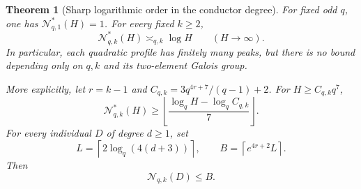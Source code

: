 \documentclass[11pt]{article}
\newtheorem{theorem}{Theorem}[section]
\begin{document}
\begin{theorem}[Sharp logarithmic order in the conductor degree]
\label{thm:quadraticModeComplexity}
For fixed odd \(q\), one has \(\mathcal N_{q,1}^{*}(H)=1\).
For every fixed \(k\geq2\),
\[
                    \mathcal N_{q,k}^{*}(H)
                         \asymp_{q,k}\log H
                    \qquad(H\to\infty).          \tag{22}
\]
In particular, each quadratic profile has finitely many peaks, but
there is no bound depending only on \(q,k\) and its two-element
Galois group.

More explicitly, let \(r=k-1\) and
\(C_{q,k}=3q^{4r+7}/(q-1)+2\). For
\(H\geq C_{q,k}q^7\),
\[
 \mathcal N_{q,k}^{*}(H)\geq
 \left\lfloor\frac{\log_q H-\log_q C_{q,k}}7\right\rfloor.   \tag{23}
\]
For every individual \(D\) of degree \(d\geq1\), set
\[
 L=\left\lceil2\log_q(4(d+3))\right\rceil,\qquad
 B=\left\lceil e^{4r+2}L\right\rceil.
\]
Then
\[
                         \mathcal N_{q,k}(D)\leq B.        \tag{24}
\]
\end{theorem}
\end{document}
